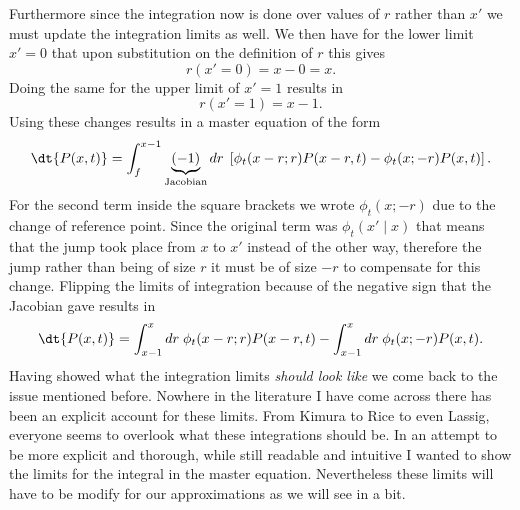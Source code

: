 Furthermore since the integration now is done over values of $r$ rather than
$x'$ we must update the integration limits as well. We then have for the lower
limit $x' = 0$ that upon substitution on the definition of $r$ this gives
\begin{equation}
  r(x' = 0) = x - 0 = x.
\end{equation}
Doing the same for the upper limit of $x' = 1$ results in
\begin{equation}
  r(x' = 1) = x - 1.
\end{equation}
Using these changes results in a master equation of the form
\begin{equation}
  \dt{P(x, t)} = \int_f^{x - 1} \underbrace{(-1)}_{\text{Jacobian}} dr \;
  \left[
  \phi_t(x - r; r) P(x - r, t) -
  \phi_t(x; -r) P(x, t)
  \right].
\end{equation}
For the second term inside the square brackets we wrote $\phi_t(x; -r)$ due to
the change of reference point. Since the original term was $\phi_t(x' \mid x)$
that means that the jump took place from $x$ to $x'$ instead of the other way,
therefore the jump rather than being of size $r$ it must be of size $-r$ to
compensate for this change. Flipping the limits of integration because of the
negative sign that the Jacobian gave results in
\begin{equation}
  \dt{P(x, t)} = \int^x_{x - 1} dr \;
  \phi_t(x - r; r) P(x - r, t) -
  \int^x_{x - 1} dr \;
  \phi_t(x; -r) P(x, t).
  \label{eq_master_eq_jump}
\end{equation}
Having showed what the integration limits \textit{should look like} we come
back to the issue mentioned before. Nowhere in the literature I have come
across there has been an explicit account for these limits. From Kimura to Rice
to even Lassig, everyone seems to overlook what these integrations should be.
In an attempt to be more explicit and thorough, while still readable and
intuitive I wanted to show the limits for the integral in the master equation.
Nevertheless these limits will have to be modify for our approximations as we
will see in a bit.

